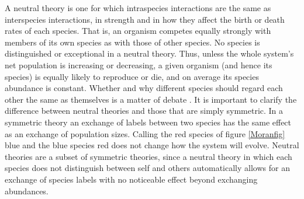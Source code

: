 A neutral theory is one for which intraspecies interactions are the same as interspecies interactions, in strength and in how they affect the birth or death rates of each species. 
That is, an organism competes equally strongly with members of its own species as with those of other species. 
No species is distinguished or exceptional in a neutral theory. 
Thus, unless the whole system's net population is increasing or decreasing, a given organism (and hence its species) is equally likely to reproduce or die, and on average its species abundance is constant. 
Whether and why different species should regard each other the same as themselves is a matter of debate \cite{Hubbell2001,Leibold2006,Leigh2007,Rosindell2011}. %
It is important to clarify the difference between neutral theories and those that are simply symmetric. %
In a symmetric theory an exchange of labels between two species has the same effect as an exchange of population sizes. 
Calling the red species of figure \ref{Moranfig} blue and the blue species red does not change how the system will evolve. %
Neutral theories are a subset of symmetric theories, since a neutral theory in which each species does not distinguish between self and others automatically allows for an exchange of species labels with no noticeable effect beyond exchanging abundances. 

